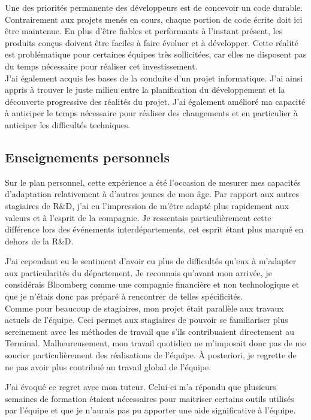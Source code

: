 \documentclass[11pt, oneside, titlepage, a4paper]{article}
\begin{document}
Une des priorités permanente des développeurs est de concevoir un code durable. Contrairement aux projets menés en cours, chaque portion de code écrite doit ici être maintenue. En plus d'être fiables et performants à l'instant présent, les produits conçus doivent être faciles à faire évoluer et à développer. Cette réalité est problématique pour certaines équipes très sollicitées, car elles ne disposent pas du temps nécessaire pour réaliser cet investissement.
\\

J'ai également acquis les bases de la conduite d'un projet informatique. J'ai ainsi appris à trouver le juste milieu entre la planification du développement et la découverte progressive des réalités du projet. J'ai également amélioré ma capacité à anticiper le temps nécessaire pour réaliser des changements et en particulier à anticiper les difficultés techniques.
	\subsection{Enseignements personnels} \label{ensperso}
Sur le plan personnel, cette expérience a été l'occasion de mesurer mes capacités d'adaptation relativement à d'autres jeunes de mon âge. Par rapport aux autres stagiaires de R\&D, j'ai eu l'impression de m'être adapté plus rapidement aux valeurs et à l'esprit de la compagnie. Je ressentais particulièrement cette différence lors des événements interdépartements, cet esprit étant plus marqué en dehors de la R\&D.

J'ai cependant eu le sentiment d'avoir eu plus de difficultés qu'eux à m'adapter aux particularités du département. Je reconnais qu'avant mon arrivée, je considérais Bloomberg comme une compagnie financière et non technologique et que je n'étais donc pas préparé à rencontrer de telles spécificités.
\\

Comme pour beaucoup de stagiaires, mon projet était parallèle aux travaux actuels de l'équipe. Ceci permet aux stagiaires de pouvoir se familiariser plus sereinement avec les méthodes de travail que s'ils contribuaient directement au Terminal. Malheureusement, mon travail quotidien ne m'imposait donc pas de me soucier particulièrement des réalisations de l'équipe. À posteriori, je regrette de ne pas avoir plus contribué au travail global de l'équipe.

J'ai évoqué ce regret avec mon tuteur. Celui-ci m'a répondu que plusieurs semaines de formation étaient nécessaires pour maitriser certains outils utilisés par l'équipe et que je n'aurais pas pu apporter une aide significative à l'équipe.
\\
\end{document}
